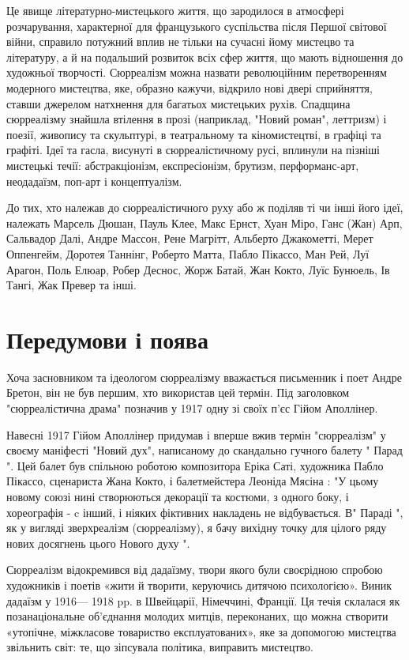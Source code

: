\documentclass[14pt]{extarticle} %
\begin{document}
Це явище літературно-мистецького життя, що зародилося в атмосфері розчарування, характерної для французького суспільства після Першої світової війни, справило потужний вплив не тільки на сучасні йому мистецво та літературу, а й на подальший розвиток всіх сфер життя, що мають відношення до художньої творчості. Сюрреалізм можна назвати революційним перетворенням модерного мистецтва, яке, образно кажучи, відкрило нові двері сприйняття, ставши джерелом натхнення для багатьох мистецьких рухів. Спадщина сюрреалізму знайшла втілення в прозі (наприклад, "Новий роман", леттризм) і поезії, живопису та скульптурі, в театральному та кіномистецтві, в графіці та графіті. Ідеї та гасла, висунуті в сюрреалістичному русі, вплинули на пізніші мистецькі течії: абстракціонізм, експресіонізм, брутизм, перформанс-арт, неодадаїзм, поп-арт і концептуалізм.

До тих, хто належав до сюрреалістичного руху або ж поділяв ті чи інші його ідеї, належать Марсель Дюшан, Пауль Клее, Макс Ернст, Хуан
Міро, Ганс (Жан) Арп, Сальвадор Далі, Андре Массон, Рене Магрітт, Альберто Джакометті, Мерет Оппенгейм, Доротея Таннінг, Роберто Матта,
Пабло Пікассо, Ман Рей, Луї Арагон, Поль Елюар, Робер Деснос, Жорж Батай, Жан Кокто, Луїс Бунюель, Ів Тангі, Жак Превер та інші. 

\section{Передумови і поява}%
Хоча засновником та ідеологом сюрреалізму вважається письменник і поет Андре Бретон, він не був першим, хто використав цей термін.
Під заголовком "сюрреалістична драма" позначив у 1917 одну зі своїх п'єс Гійом Аполлінер. 

Навесні 1917 Гійом Аполлінер придумав і вперше вжив термін "сюрреалізм" у своєму маніфесті "Новий дух", написаному до скандально гучного
балету " Парад ". Цей балет був спільною роботою композитора Еріка Саті, художника Пабло Пікассо, сценариста Жана Кокто, і балетмейстера Леоніда Мясіна : "У цьому новому союзі нині створюються декорації та костюми, з одного боку, і хореографія - c інший, і ніяких фіктивних накладень не
відбувається. В" Параді ", як у вигляді зверхреалізм (сюрреалізму), я бачу вихідну точку для цілого ряду нових досягнень цього Нового духу ". 

Сюрреалізм відокремився від дадаїзму, твори якого були своєрідною спробою художників і поетів «жити й творити, керуючись дитячою психологією». 
Виник дадаїзм у 1916— 1918 pp. в Швейцарії, Німеччині, Франції. Ця течія склалася як позанаціональне об'єднання молодих митців, переконаних, що можна
створити «утопічне, міжкласове товариство експлуатованих», яке за допомогою мистецтва звільнить світ: те, що зіпсувала політика, виправить мистецтво.
\end{document}
